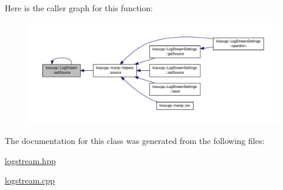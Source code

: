 Here is the caller graph for this function\-:\nopagebreak
\begin{figure}[H]
\begin{center}
\leavevmode
\includegraphics[width=350pt]{classkisscpp_1_1_log_stream_adcc3d0579fa1a4bcf6649274792b27e0_icgraph}
\end{center}
\end{figure}




The documentation for this class was generated from the following files\-:\begin{DoxyCompactItemize}
\item 
\hyperlink{logstream_8hpp}{logstream.\-hpp}\item 
\hyperlink{logstream_8cpp}{logstream.\-cpp}\end{DoxyCompactItemize}
